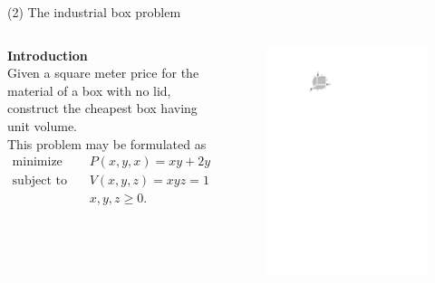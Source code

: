 \documentclass[11pt, aspectratio=149]{beamer}
\theoremstyle{plain}
\begin{document}
\begin{frame}[fragile, t]{(2) The industrial box problem}
	\begin{columns}
		\begin{column}{0.6\textwidth}
			\textbf{Introduction}\\ \vspace*{0.5em} 
			Given a square meter price for the material of a box with no lid, construct the cheapest box having unit volume.\\
			\vspace*{1em}
			This problem may be formulated as
			\begin{align*}
			\text{minimize } \quad & P(x, y, x) = xy + 2yz + 2xz  \\
			\text{subject to } \quad & V(x, y, z) = xyz = 1 \\
			& x, y, z \geq 0.
			\end{align*}
		\end{column}
		\begin{column}{0.4\textwidth}%
		\begin{figure}
			\centering
			\includegraphics[width=1.05\linewidth]{figs/box_opt_lagrange.pdf}
		\end{figure}
		\end{column}
	\end{columns}
\end{frame}
\end{document}
